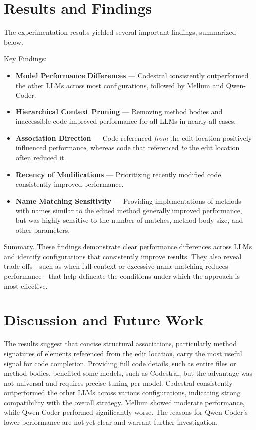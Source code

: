 \documentclass[conference]{IEEEtran}
\begin{document}
\section{Results and Findings}

The experimentation results yielded several important findings, summarized below.

Key Findings:
\begin{itemize}
\item \textbf{Model Performance Differences} — Codestral consistently outperformed the other LLMs across most configurations, followed by Mellum and Qwen-Coder.
\item \textbf{Hierarchical Context Pruning} — Removing method bodies and inaccessible code improved performance for all LLMs in nearly all cases.
\item \textbf{Association Direction} — Code referenced \emph{from} the edit location positively influenced performance, whereas code that referenced \emph{to} the edit location often reduced it.
\item \textbf{Recency of Modifications} — Prioritizing recently modified code consistently improved performance.
\item \textbf{Name Matching Sensitivity} — Providing implementations of methods with names similar to the edited method generally improved performance, but was highly sensitive to the number of matches, method body size, and other parameters.
\end{itemize}

Summary.
These findings demonstrate clear performance differences across LLMs and identify configurations that consistently improve results. They also reveal trade-offs—such as when full context or 
excessive name-matching reduces performance—that help delineate the 
conditions under which the approach is most effective.

\section{Discussion and Future Work}

The results suggest that concise structural associations, particularly method signatures of elements referenced from the edit location, 
carry the most useful signal for code completion. Providing full code details, such as entire files or method bodies, benefited some models, 
such as Codestral, but the advantage was not universal and requires precise tuning per model. 
Codestral consistently outperformed the other LLMs across various configurations,
 indicating strong compatibility with the overall strategy. Mellum showed moderate performance, 
 while Qwen-Coder performed significantly worse. The reasons for Qwen-Coder’s lower performance are not yet clear and warrant 
 further investigation.
\end{document}
